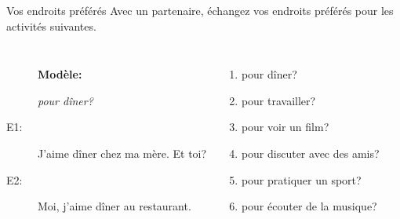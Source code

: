 \begin{frame}{Vos endroits préférés }
  Avec un partenaire, échangez vos endroits préférés pour les activités suivantes. \\
  \begin{columns}
      \begin{description}
        \item[] \textbf{Modèle:}
        \item[] \emph{pour dîner?}
        \item[E1:] J'aime dîner chez ma mère. Et toi?
        \item[] 
        \item[E2:] Moi, j'aime dîner au restaurant.
        \item[] 
      \end{description}
      \begin{enumerate}
        \item pour dîner?
        \item pour travailler?
        \item pour voir un film?
        \item pour discuter avec des amis?
        \item pour pratiquer un sport?
        \item pour écouter de la musique?
      \end{enumerate}
  \end{columns}
\end{frame}